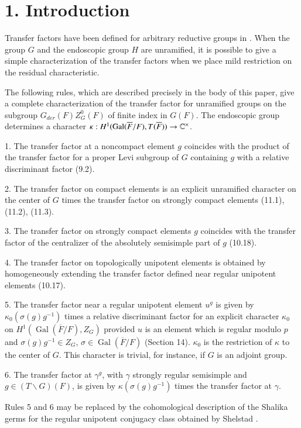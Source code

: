 \documentclass[11pt]{amsart}
\theoremstyle{plain}
\theoremstyle{definition}
\def\Gal{\operatorname{\text{Gal}}}          %
\def\Com{{\Bbb C}}                         %
\def\LANGLANDSO{21}
\def\SHELSTAD{24}
\begin{document}
\section{1.  Introduction}

Transfer factors have been defined for arbitrary
reductive groups in \cite{\LANGLANDSO}. When the group $G$ and the endoscopic
group $H$
are unramified, it is possible to give a simple
characterization of the transfer factors when we place
mild restriction on the residual characteristic.

The following rules, which are described precisely in the body of this
paper, give a complete characterization of the transfer factor for
unramified groups on the subgroup $G_{der}(F)Z_G^0(F)$ of finite
index in $G(F)$.
The endoscopic group determines a character
$\kappa:H^1(\Gal(\overline F/F),T(\overline F))\to \Com^\times$.

{1.} The transfer factor at a noncompact 
element $g$ coincides with the product of the transfer factor for a proper
Levi subgroup of $G$ containing $g$ with a relative discriminant factor (9.2).

{2.} The transfer factor on compact elements is an explicit
unramified character on the center of
$G$ times the transfer factor on strongly compact elements (11.1), (11.2), (11.3).

{3.}  The transfer factor on strongly compact 
elements $g$ coincides with the transfer factor of
the centralizer of the absolutely semisimple part of $g$ (10.18).

{4.} The transfer factor on topologically unipotent elements
is obtained by homogeneously extending the transfer
factor defined near regular unipotent elements (10.17).

{5.}  The transfer factor near a regular unipotent element
$u^g$ is given by $\kappa_0(\sigma(g)g^{-1})$ times a relative discriminant
factor for an
explicit character $\kappa_0$ on $H^1(\Gal(\overline F/F),Z_G)$
provided $u$ is an element which is regular modulo $p$ and
$\sigma(g)g^{-1}\in Z_G$, $\sigma\in\Gal(\overline F/F)$ (Section 14).
$\kappa_0$ is the restriction of $\kappa$ to the center of $G$.
This character is trivial, for instance, if $G$ is an adjoint group.

{6.}  The transfer factor at $\gamma^g$, with $\gamma$ strongly regular semisimple
and $g\in (T\backslash G)(F)$, is
given by $\kappa(\sigma(g)g^{-1})$ times the transfer factor at $\gamma$.

Rules 5 and 6 may be replaced by the cohomological description of the 
Shalika germs for the regular unipotent conjugacy class
obtained by Shelstad \cite{\SHELSTAD}.
\end{document}
